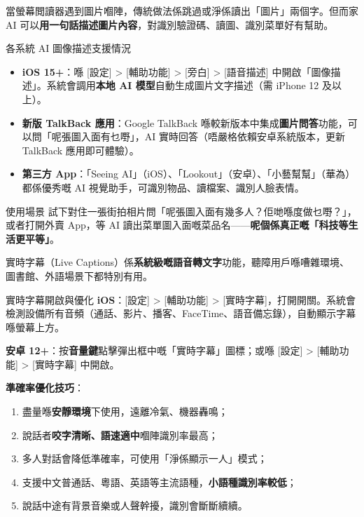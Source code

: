 
當螢幕閲讀器遇到圖片嗰陣，傳統做法係跳過或淨係讀出「圖片」兩個字。但而家 AI 可以\textbf{用一句話描述圖片內容}，對識別驗證碼、讀圖、識別菜單好有幫助。

\begin{tcbinfo}{各系統 AI 圖像描述支援情況}
\begin{itemize}
  \item \textbf{iOS 15+}：喺 [設定] > [輔助功能] > [旁白] > [語音描述] 中開啟「圖像描述」。系統會調用\textbf{本地 AI 模型}自動生成圖片文字描述（需 iPhone 12 及以上）。
  \item \textbf{新版 TalkBack 應用}：Google TalkBack 喺較新版本中集成\textbf{圖片問答}功能，可以問「呢張圖入面有乜嘢」，AI 實時回答（唔嚴格依賴安卓系統版本，更新 TalkBack 應用即可體驗）。
  \item \textbf{第三方 App}：「Seeing AI」（iOS）、「Lookout」（安卓）、「小藝幫幫」（華為）都係優秀嘅 AI 視覺助手，可識別物品、讀檔案、識別人臉表情。
\end{itemize}

\end{tcbinfo}

\begin{tcbpractice}{使用場景}
試下對住一張街拍相片問「呢張圖入面有幾多人？佢哋喺度做乜嘢？」，或者打開外賣 App，等 AI 讀出菜單圖入面嘅菜品名——\textbf{呢個係真正嘅「科技等生活更平等」}。

\end{tcbpractice}


實時字幕（Live Captions）係\textbf{系統級嘅語音轉文字}功能，聽障用戶喺嘈雜環境、圖書館、外語場景下都特別有用。

\begin{tcbinfo}{實時字幕開啟與優化}
\textbf{iOS}：[設定] > [輔助功能] > [實時字幕]，打開開關。系統會檢測設備所有音頻（通話、影片、播客、FaceTime、語音備忘錄），自動顯示字幕喺螢幕上方。

\textbf{安卓 12+}：按\textbf{音量鍵}點擊彈出框中嘅「實時字幕」圖標；或喺 [設定] > [輔助功能] > [實時字幕] 中開啟。

\textbf{準確率優化技巧}：

\begin{enumerate}
  \item 盡量喺\textbf{安靜環境}下使用，遠離冷氣、機器轟鳴；
  \item 說話者\textbf{咬字清晰、語速適中}嗰陣識別率最高；
  \item 多人對話會降低準確率，可使用「淨係顯示一人」模式；
  \item 支援中文普通話、粵語、英語等主流語種，\textbf{小語種識別率較低}；
  \item 說話中途有背景音樂或人聲幹擾，識別會斷斷續續。
\end{enumerate}

\end{tcbinfo}

